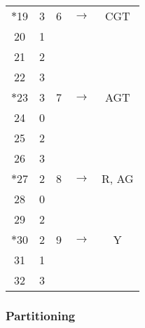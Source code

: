 \begin{center}
\begin{tabular}{ccccc}
$\ast$19 &    3    &    6    & $\longrightarrow $ &  {CGT}                 \\
  20     &    1    &         &             &                        \\
  21     &    2    &         &             &                        \\
  22     &    3    &         &             &                        \\ \hline
$\ast$23 &    3    &    7    & $\longrightarrow $ &  {AGT}                 \\
  24     &    0    &         &             &                        \\
  25     &    2    &         &             &                        \\
  26     &    3    &         &             &                        \\ \hline
$\ast$27 &    2    &    8    & $\longrightarrow $ &  R, {AG}               \\
  28     &    0    &         &             &                        \\
  29     &    2    &         &             &                        \\ \hline
$\ast$30 &    2    &    9    & $\longrightarrow $ &  Y                     \\
  31     &    1    &         &             &                        \\
  32     &    3    &         &             &                        \\ \hline
\end{tabular}
\end{center}

\subsubsection{Partitioning}

